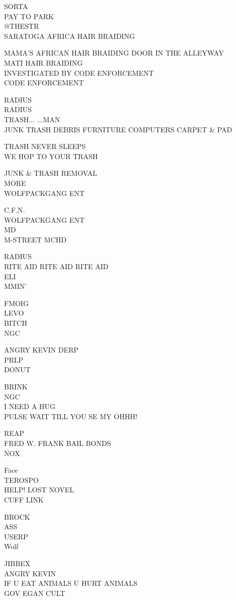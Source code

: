 \documentclass[10pt,letterpaper]{article}
\begin{document}
SORTA\\
PAY TO PARK\\
@THESTR\\
SARATOGA AFRICA HAIR BRAIDING

MAMA'S AFRICAN HAIR BRAIDING DOOR IN THE ALLEYWAY\\
MATI HAIR BRAIDING\\
INVESTIGATED BY CODE ENFORCEMENT\\
CODE ENFORCEMENT

RADIUS\\
RADIUS\\
TRASH... ...MAN\\
JUNK TRASH DEBRIS FURNITURE COMPUTERS CARPET \& PAD

TRASH NEVER SLEEPS\\
WE HOP TO YOUR TRASH

JUNK \& TRASH REMOVAL\\
MORE\\
WOLFPACKGANG ENT

C.F.N.\\
WOLFPACKGANG ENT\\
MD\\
M{-}STREET MCHD

RADIUS\\
RITE AID RITE AID RITE AID\\
ELI\\
MMIN'

FMOIG\\
LEVO\\
BITCH\\
NGC

ANGRY KEVIN DERP\\
PRLP\\
DONUT

BRINK\\
NGC\\
I NEED A HUG\\
PULSE WAIT TILL YOU SE MY OHHH!

REAP\\
FRED W. FRANK BAIL BONDS\\
NOX

Face\\
TEROSPO\\
HELP!  LOST NOVEL\\
CUFF LINK

BROCK\\
ASS\\
USERP\\
Wolf

JIBBEX\\
ANGRY KEVIN\\
IF U EAT ANIMALS U HURT ANIMALS\\
GOV EGAN CULT
\end{document}

